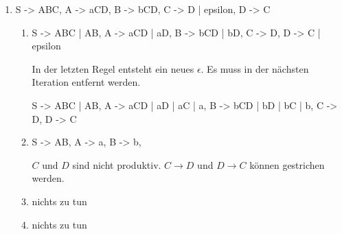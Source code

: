 \documentclass{lehramt-informatik-aufgabe}
\begin{document}
\begin{enumerate}

\item %

\begin{liProduktionsRegeln}
S -> ABC,
A -> aCD,
B -> bCD,
C -> D | epsilon,
D -> C
\end{liProduktionsRegeln}

\begin{liAntwort}
\begin{enumerate}
\item {}

\begin{liProduktionsRegeln}
S -> ABC | AB,
A -> aCD | aD,
B -> bCD | bD,
C -> D,
D -> C | epsilon
\end{liProduktionsRegeln}

In der letzten Regel entsteht ein neues $\epsilon$. Es muss in der
nächsten Iteration entfernt werden.

\begin{liProduktionsRegeln}
S -> ABC | AB,
A -> aCD | aD | aC | a,
B -> bCD | bD | bC | b,
C -> D,
D -> C
\end{liProduktionsRegeln}

\item {}

\begin{liProduktionsRegeln}
S -> AB,
A -> a,
B -> b,
\end{liProduktionsRegeln}

$C$ und $D$ sind nicht produktiv. $C \rightarrow D$ und $D \rightarrow
C$ können gestrichen werden.

\item {}

nichts zu tun

\item {}

nichts zu tun
\end{enumerate}
\end{liAntwort}
\end{enumerate}
\end{document}
